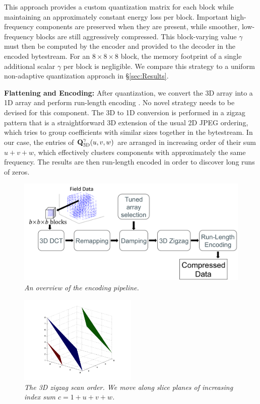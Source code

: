 This approach provides a custom quantization matrix for each block while maintaining an approximately constant energy loss per block. Important high-frequency components are preserved when they are present, while smoother, low-frequency blocks are still aggressively compressed. This block-varying value $\gamma$ must then be computed by the encoder and provided to the decoder in the encoded bytestream. For an $8 \times 8 \times 8$ block, the memory footprint of a single additional scalar $\gamma$ per block is negligible. We compare this strategy to a uniform non-adaptive quantization approach in \S\ref{sec:Results}.

\noindent \textbf{Flattening and Encoding:} After quantization, we convert the 3D array into a 1D array and perform run-length encoding \cite{Yeo:1995:VRD,Sayood:2012:JPEG}. No novel strategy needs to be devised for this component. The 3D to 1D conversion is performed in a zigzag pattern that is a straightforward 3D extension of the usual 2D JPEG ordering, which tries to group coefficients with similar sizes together in the bytestream.  In our case, the entries of $\mathbf{Q}^{\gamma}_{\textrm{3D}}(u,v,w)$ are arranged in increasing order of their sum $u + v + w$, which effectively clusters components with approximately the same frequency. The results are then run-length encoded in order to discover long runs of zeros.

\begin{figure}
\includegraphics[width=\textwidth]{chap4/figures/compression_flowchart.png}
\caption{\em An overview of the encoding pipeline.}
\label{fig:flowchart}
\end{figure}

\begin{figure}
\centering
\includegraphics[width=0.5\textwidth]{chap4/figures/zigzag3d.png}
\caption{\em The 3D zigzag scan order. We move along slice planes of increasing index sum $c = 1 + u + v + w$.}
\label{fig:zigzag3d}
\end{figure}

